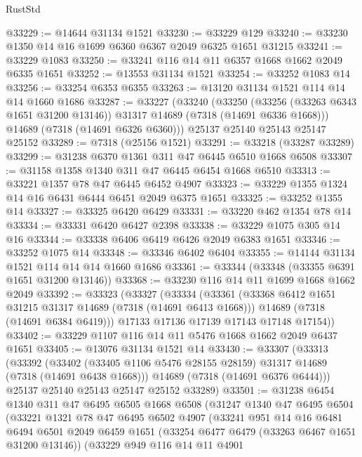 \begin{lexlean}{RustStd}
\begin{coremodule}
@33229 := @14644 @31134 @1521
@33230 := @33229 @129
@33240 := @33230 @1350 @14 @16 @1699 @6360 @6367 @2049 @6325 @1651 @31215
@33241 := @33229 @1083
@33250 := @33241 @116 @14 @11 @6357 @1668 @1662 @2049 @6335 @1651
@33252 := @13553 @31134 @1521
@33254 := @33252 @1083 @14
@33256 := @33254 @6353 @6355
@33263 := @13120 @31134 @1521 @114 @14 @14 @1660 @1686
@33287 := @33227
    (@33240
      (@33250
        (@33256 (@33263 @6343 @1651 @31200 @13146))
        @31317
        @14689
        (@7318 (@14691 @6336 @1668)))
      @14689
      (@7318 (@14691 @6326 @6360)))
    @25137
    @25140
    @25143
    @25147
    @25152
@33289 := @7318 (@25156 @1521)
@33291 := @33218 (@33287 @33289)
@33299 := @31238 @6370 @1361 @311 @47 @6445 @6510 @1668 @6508
@33307 := @31158 @1358 @1340 @311 @47 @6445 @6454 @1668 @6510
@33313 := @33221 @1357 @78 @47 @6445 @6452 @4907
@33323 := @33229 @1355 @1324 @14 @16 @6431 @6444 @6451 @2049 @6375 @1651
@33325 := @33252 @1355 @14
@33327 := @33325 @6420 @6429
@33331 := @33220 @462 @1354 @78 @14
@33334 := @33331 @6420 @6427 @2398
@33338 := @33229 @1075 @305 @14 @16
@33344 := @33338 @6406 @6419 @6426 @2049 @6383 @1651
@33346 := @33252 @1075 @14
@33348 := @33346 @6402 @6404
@33355 := @14144 @31134 @1521 @114 @14 @14 @1660 @1686
@33361 := @33344 (@33348 (@33355 @6391 @1651 @31200 @13146))
@33368 := @33230 @116 @14 @11 @1699 @1668 @1662 @2049
@33392 := @33323
    (@33327
      (@33334
        (@33361
          (@33368 @6412 @1651 @31215 @31317 @14689 (@7318 (@14691 @6413 @1668)))
          @14689
          (@7318 (@14691 @6384 @6419)))
        @17133
        @17136
        @17139
        @17143
        @17148
        @17154))
@33402 := @33229 @1107 @116 @14 @11 @5476 @1668 @1662 @2049 @6437 @1651
@33405 := @13076 @31134 @1521 @14
@33430 := @33307
    (@33313
      (@33392
        (@33402 (@33405 @1106 @5476 @28155 @28159) @31317 @14689 (@7318 (@14691 @6438 @1668)))
        @14689
        (@7318 (@14691 @6376 @6444)))
      @25137
      @25140
      @25143
      @25147
      @25152
      @33289)
@33501 := @31238
    @6454
    @1340
    @311
    @47
    @6495
    @6505
    @1668
    @6508
    (@31247
      @1340
      @47
      @6495
      @6504
      (@33221
        @1321
        @78
        @47
        @6495
        @6502
        @4907
        (@33241
          @951
          @14
          @16
          @6481
          @6494
          @6501
          @2049
          @6459
          @1651
          (@33254 @6477 @6479 (@33263 @6467 @1651 @31200 @13146))
          (@33229
            @949
            @116
            @14
            @11
            @4901

\end{coremodule}
\end{lexlean}
